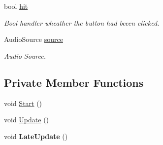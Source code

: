 \begin{DoxyCompactItemize}
\mbox{\label{class_osu_circle_a8f6408f9a87cff6a4297f129fb5f3920}} 
bool \hyperlink{class_osu_circle_a8f6408f9a87cff6a4297f129fb5f3920}{hit}
\begin{DoxyCompactList}\small\item\em Bool handler wheather the button had beeen clicked. \end{DoxyCompactList}\item 
\mbox{\label{class_osu_circle_a920d959e390a0e4a2e04c981aa608878}} 
Audio\+Source \hyperlink{class_osu_circle_a920d959e390a0e4a2e04c981aa608878}{source}
\begin{DoxyCompactList}\small\item\em Audio Source. \end{DoxyCompactList}\end{DoxyCompactItemize}
\subsection*{Private Member Functions}
\begin{DoxyCompactItemize}
\item 
void \hyperlink{class_osu_circle_ad681160a65a26c66917d2264c3a4d23c}{Start} ()
\item 
void \hyperlink{class_osu_circle_afe2813ce3da745f0e5a43aafad6fb419}{Update} ()
\item 
\mbox{\label{class_osu_circle_a0aa9d1bda97523ca244fdd683d20b088}} 
void {\bfseries Late\+Update} ()
\end{DoxyCompactItemize}
